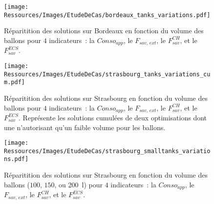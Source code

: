 
\begin{landscape}

\begin{figure}
    \centering
    \texttt{[image: Ressources/Images/EtudeDeCas/bordeaux\_tanks\_variations.pdf]}
    \caption[Réparitition des solutions en fonction des sous-groupes de taille de
             ballon pour Bordeaux.]
            {Réparitition des solutions sur Bordeaux en fonction du volume des ballons
             pour $4$ indicateurs~: la $Conso_{app}$, le $F_{sav,\, ext}$,
             le $F_{sav}^{CH}$, et le $F_{sav}^{ECS}$.}
    \label{fig:tanks_variations_bordeaux}
\end{figure}

\begin{figure}
    \centering
    \texttt{[image: Ressources/Images/EtudeDeCas/strasbourg\_tanks\_variations\_cum.pdf]}
    \caption[Réparitition des solutions en fonction des sous-groupes de taille de
             ballon pour Strasbourg.]
             {Réparitition des solutions sur Strasbourg en fonction du volume des ballons
             pour $4$ indicateurs~: la $Conso_{app}$, le $F_{sav,\, ext}$,
             le $F_{sav}^{CH}$, et le $F_{sav}^{ECS}$. Représente les solutions cumulées
             de deux optimisations dont une n’autorisant qu’un faible volume pour les
             ballons.}
    \label{fig:tanks_variations_strasbourg}
\end{figure}

\begin{figure}
    \centering
    \texttt{[image: Ressources/Images/EtudeDeCas/strasbourg\_smalltanks\_variations.pdf]}
    \caption[Réparitition des solutions en fonction de faibles volumes de ballons.]
            {Réparitition des solutions sur Strasbourg en fonction du volume des ballons ($100$, $150$,
             ou \SI{200}{\litre}) pour $4$ indicateurs~: la $Conso_{app}$, le
             $F_{sav,\, ext}$, le $F_{sav}^{CH}$, et le $F_{sav}^{ECS}$.}
    \label{fig:tanks_small_variations_strasbourg}
\end{figure}

\end{landscape}
